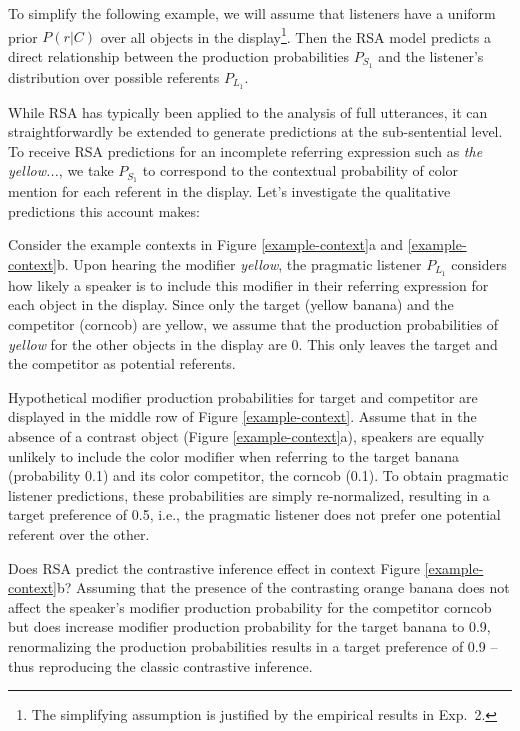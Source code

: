\documentclass[10pt,letterpaper]{article}
\newcommand{\figref}[1]{Figure \ref{#1}}
\begin{document}
To simplify the following example, we will assume that listeners have a uniform prior $P(r|C)$ over all objects in the display\footnote{The simplifying assumption is justified by the empirical results in Exp.~2.}. Then the RSA model predicts a direct relationship between the production probabilities $P_{S_1}$ and the listener's distribution over possible referents $P_{L_1}$. 

While RSA has typically been applied to the analysis of full utterances, it can straightforwardly be extended to generate predictions at the sub-sentential level. To receive RSA predictions for an incomplete referring expression such as \textit{the yellow...}, we take $P_{S_1}$ to correspond to the contextual probability of color mention for each referent in the display. Let's investigate the qualitative predictions this account makes:

Consider the example contexts in \figref{example-context}a and \ref{example-context}b. Upon hearing the modifier \textit{yellow}, the pragmatic listener $P_{L_1}$ considers how likely a speaker is to include this modifier in their referring expression for each object in the display. Since only the target (yellow banana) and the competitor (corncob) are yellow, we assume that the production probabilities of \textit{yellow} for the other objects in the display are 0. This only leaves the target and the competitor as potential referents. 

Hypothetical modifier production probabilities for target and competitor are displayed in the middle row of \figref{example-context}. 
Assume that in the absence of a contrast object (\figref{example-context}a), speakers are equally unlikely to include the color modifier when referring to the target banana (probability 0.1) and its color competitor, the corncob (0.1). To obtain pragmatic listener predictions, these probabilities are simply re-normalized, resulting in a target preference of 0.5, i.e., the pragmatic listener does not  prefer one potential referent over the other.

Does RSA predict the contrastive inference effect in context \figref{example-context}b? Assuming that the presence of the contrasting orange banana does not affect the speaker's modifier production probability for the competitor corncob but does increase modifier production probability for the target banana to 0.9,  renormalizing the production probabilities results in a target preference of 0.9 -- thus reproducing the classic contrastive inference.
\end{document}

